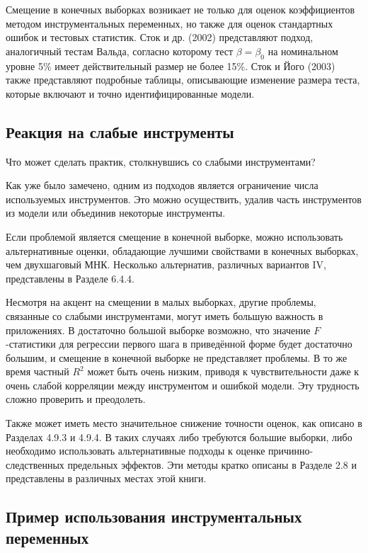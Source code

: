 Смещение в конечных выборках возникает не только для оценок коэффициентов методом инструментальных переменных, но также для оценок стандартных ошибок и тестовых статистик. Сток и др. (2002) представляют подход, аналогичный тестам Вальда, согласно которому тест $\beta = \beta_0$ на номинальном уровне 5\% имеет действительный размер не более 15\%. Сток и Його (2003) также представляют подробные таблицы, описывающие изменение размера теста, которые включают и точно идентифицированные модели. 

\subsection{Реакция на слабые инструменты}

Что может сделать практик, столкнувшись со слабыми инструментами?

Как уже было замечено, одним из подходов является ограничение числа используемых инструментов. Это можно осуществить, удалив часть инструментов из модели или объединив некоторые инструменты.

Если проблемой является смещение в конечной выборке, можно использовать альтернативные оценки, обладающие лучшими свойствами в конечных выборках, чем двухшаговый МНК. Несколько альтернатив, различных вариантов IV, представлены в Разделе 6.4.4.

Несмотря на акцент на смещении в малых выборках, другие проблемы, связанные со слабыми инструментами, могут иметь большую важность в приложениях. В достаточно большой выборке возможно, что значение $F$-статистики для регрессии первого шага в приведённой форме будет достаточно большим, и смещение в конечной выборке не представляет проблемы. В то же время частный $R^2$ может быть очень низким, приводя к чувствительности даже к очень слабой корреляции между инструментом и ошибкой модели. Эту трудность сложно проверить и преодолеть.

Также может иметь место значительное снижение точности оценок, как описано в Разделах 4.9.3 и 4.9.4. В таких случаях либо требуются большие выборки, либо необходимо использовать альтернативные подходы к оценке причинно-следственных предельных эффектов. Эти методы кратко описаны в Разделе 2.8 и представлены в различных местах этой книги.

\subsection{Пример использования инструментальных переменных}


